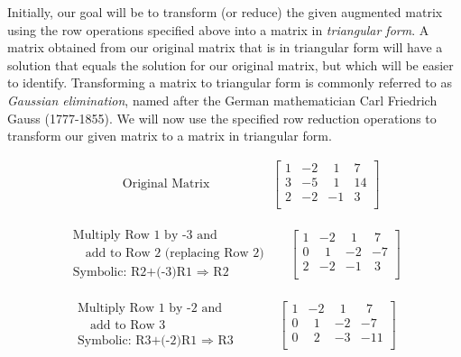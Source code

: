 Initially, our goal will be to transform (or reduce) the given augmented matrix using the row operations specified above into a matrix in \textit{triangular form}.  A matrix obtained from our original matrix that is in triangular form will have a solution that equals the solution for our original matrix, but which will be easier to identify.
\pp
{} Transforming a matrix to triangular form is commonly referred to as \textit{Gaussian elimination}, named after the German mathematician Carl Friedrich Gauss (1777-1855).
\pp
We will now use the specified row reduction operations to transform our given matrix to a matrix in triangular form.
\begin{example}
\begin{eqnarray*}
~~~~~~~~~~~~\text{Original~Matrix}%
& &
~~~~~~~~~~~~~~~\left[
\begin{array}{ccc|c}
1 & -2 & ~~1 & 7\\
3 & -5 & ~~1 & 14\\
2 & -2 & -1 & 3~\\
\end{array}\right]
\end{eqnarray*}

\begin{eqnarray*}
\begin{array}{l}
\text{Multiply Row 1 by -3 and}\\
\text{~~~add to Row 2 (replacing Row 2)}\\
\text{Symbolic: R2+(-3)R1~}\Rightarrow \text{~R2}
\end{array}
&&
\left[
\begin{array}{ccc|c}
1 & -2 & ~~1 & ~7\\
0 & ~~1 & -2 & -7\\
2 & -2 & -1 & ~3\\
\end{array}
\right]
\end{eqnarray*}

\begin{eqnarray*}
\begin{array}{l}
\text{Multiply Row 1 by -2 and}\\
\text{~~~add to Row 3}\\
\text{Symbolic: R3+(-2)R1~}\Rightarrow \text{~R3}
\end{array}
&&
~~~~~~~\left[
\begin{array}{ccc|c}
1 & -2 & ~~1 & ~~7\\
0 & ~~1 & -2 & -7\\
0 & ~~2 & -3 & -11\\
\end{array}
\right]
\end{eqnarray*}


\end{example}
